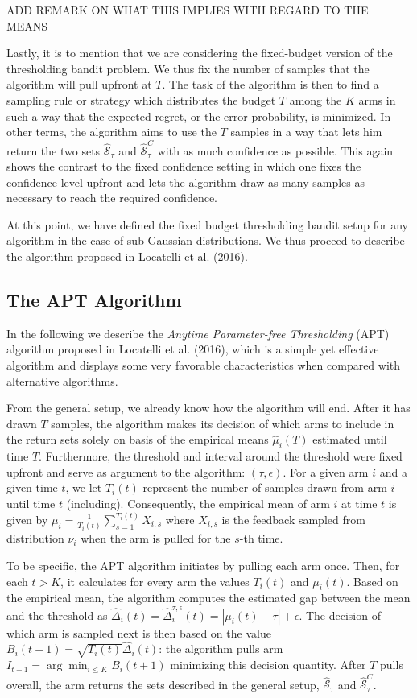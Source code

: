 \documentclass[12pt,]{article}
\begin{document}
ADD REMARK ON WHAT THIS IMPLIES WITH REGARD TO THE MEANS

Lastly, it is to mention that we are considering the fixed-budget
version of the thresholding bandit problem. We thus fix the number of
samples that the algorithm will pull upfront at \(T\). The task of the
algorithm is then to find a sampling rule or strategy which distributes
the budget \(T\) among the \(K\) arms in such a way that the expected
regret, or the error probability, is minimized. In other terms, the
algorithm aims to use the \(T\) samples in a way that lets him return
the two sets \(\hat{\mathcal{S}}_{\tau}\) and
\(\hat{\mathcal{S}}_{\tau}^C\) with as much confidence as possible. This
again shows the contrast to the fixed confidence setting in which one
fixes the confidence level upfront and lets the algorithm draw as many
samples as necessary to reach the required confidence.

At this point, we have defined the fixed budget thresholding bandit
setup for any algorithm in the case of sub-Gaussian distributions. We
thus proceed to describe the algorithm proposed in Locatelli et al.
(2016).

\subsection{The APT Algorithm}\label{the-apt-algorithm}

In the following we describe the \emph{Anytime Parameter-free
Thresholding} (APT) algorithm proposed in Locatelli et al. (2016), which
is a simple yet effective algorithm and displays some very favorable
characteristics when compared with alternative algorithms.

From the general setup, we already know how the algorithm will end.
After it has drawn \(T\) samples, the algorithm makes its decision of
which arms to include in the return sets solely on basis of the
empirical means \(\hat{\mu}_i(T)\) estimated until time \(T\).
Furthermore, the threshold and interval around the threshold were fixed
upfront and serve as argument to the algorithm: \((\tau, \epsilon)\).
For a given arm \(i\) and a given time \(t\), we let \(T_i(t)\)
represent the number of samples drawn from arm \(i\) until time \(t\)
(including). Consequently, the empirical mean of arm \(i\) at time \(t\)
is given by \(\mu_i = \frac{1}{T_i(t)} \sum_{s=1}^{T_i(t)} X_{i,s}\)
where \(X_{i,s}\) is the feedback sampled from distribution \(\nu_i\)
when the arm is pulled for the \(s\)-th time.

To be specific, the APT algorithm initiates by pulling each arm once.
Then, for each \(t > K\), it calculates for every arm the values
\(T_i(t)\) and \(\mu_i(t)\). Based on the empirical mean, the algorithm
computes the estimated gap between the mean and the threshold as
\(\hat{\Delta}_i(t) = \hat{\Delta}_i^{\tau, \epsilon}(t) = |\mu_i(t) - \tau| + \epsilon\).
The decision of which arm is sampled next is then based on the value
\(B_i(t+1) = \sqrt{T_i(t)} \hat{\Delta}_i(t)\): the algorithm pulls arm
\(I_{t+1} = \arg \min_{i\leq K} B_i(t+1)\) minimizing this decision
quantity. After \(T\) pulls overall, the arm returns the sets described
in the general setup, \(\hat{\mathcal{S}}_{\tau}\) and
\(\hat{\mathcal{S}}^C_{\tau}\).
\end{document}
